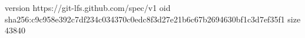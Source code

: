 version https://git-lfs.github.com/spec/v1
oid sha256:c9c958e392c7df234c034370c0edc8f3d27e21b6c67b2694630bf1c3d7ef35f1
size 43840
